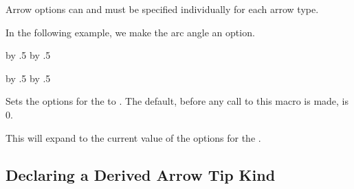 \begin{command}{\pgfarrowsdeclare{}}
  Arrow options can and must be specified individually for each arrow
  type.

  In the following example, we make the arc angle an option.
\begin{codeexample}[]
{
  \arrowsize=0.2pt
  \advance\arrowsize by .5\pgflinewidth
  \pgfarrowsleftextend{-4\arrowsize-.5\pgflinewidth}
  \pgfarrowsrightextend{.5\pgflinewidth}
}
{
  \arrowsize=0.2pt
  \advance\arrowsize by .5\pgflinewidth
  \pgfsetdash{}{0pt} %
  \pgfsetroundjoin   %
  \pgfsetroundcap    %
  \pgfpathmoveto{\pgfpointorigin}
  \pgfusepathqstroke
  \pgfpathmoveto{\pgfpointorigin}
  \pgfusepathqstroke
}
\end{codeexample}
\end{command}

{
  \arrowsize=0.2pt
  \advance\arrowsize by .5\pgflinewidth
  \pgfarrowsleftextend{-4\arrowsize-.5\pgflinewidth}
  \pgfarrowsrightextend{.5\pgflinewidth}
}
{
  \arrowsize=0.2pt
  \advance\arrowsize by .5\pgflinewidth
  \pgfsetdash{}{0pt} %
  \pgfsetroundjoin   %
  \pgfsetroundcap    %
  \pgfpathmoveto{\pgfpoint{-4\arrowsize}{4\arrowsize}}
  \pgfusepathqstroke
  \pgfpathmoveto{\pgfpointorigin}
  \pgfusepathqstroke
}

\begin{command}{\pgfsetarrowoptions{}}
  Sets the options for the  to . The
  default, before any call to this macro is made, is 0.
\end{command}

\begin{command}{\pgfgetarrowoptions{}}
  This will expand to the current value of the options for the
  .
\end{command}



\subsection{Declaring a Derived Arrow Tip Kind}

